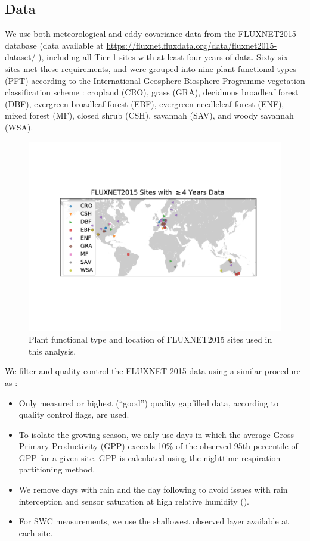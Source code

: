 \documentclass[12pt]{article}
\begin{document}
\subsection{Data}
\label{data}
We use both meteorological and eddy-covariance data from the
FLUXNET2015 database (data available at \sloppy
\url{https://fluxnet.fluxdata.org/data/fluxnet2015-dataset/} \sloppy),
including all Tier 1 sites with at least four years of data. Sixty-six
sites met these requirements, and were grouped into nine plant
functional types (PFT) according to the International
Geosphere-Biosphere Programme vegetation classification scheme
\citep{Loveland_1999}: cropland (CRO), grass (GRA), deciduous
broadleaf forest (DBF), evergreen broadleaf forest (EBF), evergreen
needleleaf forest (ENF), mixed forest (MF), closed shrub (CSH),
savannah (SAV), and woody savannah (WSA).

\begin{figure}[h]
  \centering \includegraphics[trim={0 3cm 0 3cm}, clip]{./map.pdf}
  \caption{Plant functional type and location of FLUXNET2015 sites
    used in this analysis.}
  \label{map_fig}
\end{figure}
We filter and quality control the FLUXNET-2015 data using a similar
procedure as \cite{Zhou_2015}:

\begin{itemize}
\item Only measured or highest (``good'') quality gapfilled data,
  according to quality control flags, are used.
\item To isolate the growing season, we only use days in which the
  average Gross Primary Productivity (GPP) exceeds 10\% of the
  observed 95th percentile of GPP for a given site. GPP is calculated
  using the nighttime respiration partitioning method.
\item We remove days with rain and the day following to avoid issues
  with rain interception and sensor saturation at high relative
  humidity (\cite{Medlyn_2017}).
\item For SWC measurements, we use the shallowest observed layer
  available at each site.
\end{itemize}
\end{document}
